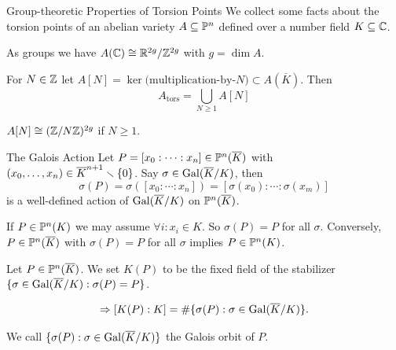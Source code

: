 \documentclass{beamer}
\begin{document}
\begin{frame}{Group-theoretic Properties of Torsion Points} 
  We collect some facts about the torsion points of an
  abelian variety $A\subseteq{\mathbb{P}}^n$ defined over a number field
  $K\subseteq {\mathbb{C}}$.

  As groups we have $A({\mathbb{C}}) \cong {\mathbb{R}}^{2g}/{\mathbb{Z}}^{2g}$ with $g=\dim A$.

  For $N\in{\mathbb{Z}}$ let $A[N] = \ker \text{(multiplication-by-$N$)}
  \subset A(\overline K)$.
  Then
  \begin{equation*}
    A_{\mathrm{tors}} = \bigcup_{N\ge 1} A[N]
  \end{equation*}
  \begin{lemma}
    $A[N] \cong ({\mathbb{Z}}/N{\mathbb{Z}})^{2g}$ if $N\ge 1$.  
  \end{lemma}
\end{frame}


\begin{frame}{The Galois Action}
  Let
  $P=[x_0:\cdots:x_n]\in {\mathbb{P}}^n(\overline{K})$ with  $(x_0,\ldots,x_n) \in
  \overline{K}^{n+1}\smallsetminus\{0\}$.
  Say $\sigma\in \mathrm{Gal}(\overline{K}/K)$, then
  \begin{equation*}
    \sigma(P)=  \sigma([x_0:\cdots:x_n]) = [\sigma(x_0):\cdots:\sigma(x_m)]
  \end{equation*}
  is a well-defined action of $\mathrm{Gal}(\overline{K}/K)$ on ${\mathbb{P}}^n(\overline K)$.

  If $P\in {\mathbb{P}}^n(K)$ we may assume $\forall i:x_i\in K$. So
  $\sigma(P)=P$ for all $\sigma$.
  Conversely, 
  $P\in {\mathbb{P}}^n(\overline K)$ with $\sigma(P)=P$ for all $\sigma$ implies
  $P\in {\mathbb{P}}^n(K)$.

  \begin{definition}
    Let $P\in {\mathbb{P}}^n(\overline K)$. 
    We set $K(P)$ to be the fixed field of the stabilizer
    $\{\sigma\in \mathrm{Gal}(\overline{K}/K) : \sigma(P)=P\}$. 
  \end{definition}


  \begin{equation*}
    \Rightarrow [K(P):K]  = \#\{\sigma(P) : \sigma\in\mathrm{Gal}(\overline{K}/K) \}. 
  \end{equation*}

  We call $\{\sigma(P) : \sigma\in \mathrm{Gal}(\overline{K}/K)\}$ the \alert{Galois
    orbit} of $P$. 
\end{frame}
\end{document}
